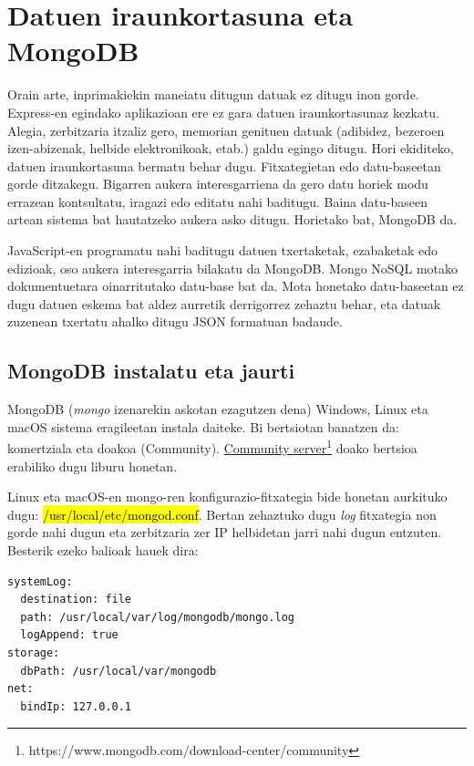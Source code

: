 \chapter{Datuen iraunkortasuna eta MongoDB}

Orain arte, inprimakiekin maneiatu ditugun datuak ez ditugu inon gorde. Express-en egindako aplikazioan ere ez gara datuen iraunkortasunaz kezkatu. Alegia, zerbitzaria itzaliz gero, memorian genituen datuak (adibidez, bezeroen izen-abizenak, helbide elektronikoak, etab.) galdu egingo ditugu. Hori ekiditeko, datuen iraunkortasuna bermatu behar dugu. Fitxategietan edo datu-baseetan gorde ditzakegu. Bigarren aukera interesgarriena da gero datu horiek modu errazean kontsultatu, iragazi edo editatu nahi baditugu. Baina datu-baseen artean sistema bat hautatzeko aukera asko ditugu. Horietako bat, MongoDB  da.

JavaScript-en programatu nahi baditugu datuen txertaketak, ezabaketak edo edizioak, oso aukera interesgarria bilakatu da MongoDB. Mongo NoSQL motako dokumentuetara oinarritutako datu-base bat da. Mota honetako datu-baseetan ez dugu datuen eskema bat aldez aurretik derrigorrez zehaztu behar, eta datuak zuzenean txertatu ahalko ditugu JSON formatuan badaude. 

\section{MongoDB instalatu eta jaurti}

MongoDB (\textit{mongo} izenarekin askotan ezagutzen dena) Windows, Linux eta macOS sistema eragileetan instala daiteke. Bi bertsiotan banatzen da: komertziala eta doakoa (Community).  \href{https://www.mongodb.com/download-center/community}{Community server}\footnote{https://www.mongodb.com/download-center/community} doako bertsioa erabiliko dugu liburu honetan. 

Linux eta macOS-en mongo-ren konfigurazio-fitxategia bide honetan aurkituko dugu:  \hl{/usr/local/etc/mongod.conf}. Bertan zehaztuko dugu \textit{log} fitxategia non gorde nahi dugun eta zerbitzaria zer IP helbidetan jarri nahi dugun entzuten. Besterik ezeko balioak hauek dira:

\begin{lstlisting}[]
systemLog:
  destination: file
  path: /usr/local/var/log/mongodb/mongo.log
  logAppend: true
storage:
  dbPath: /usr/local/var/mongodb
net:
  bindIp: 127.0.0.1
\end{lstlisting}

